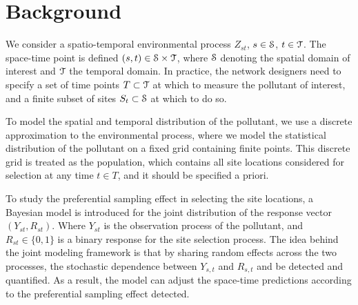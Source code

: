 \section{Background}
We consider a spatio-temporal environmental process $Z_{st}$, $s\in \mathcal{S}$, $t\in \mathcal{T}$.
The space-time point is defined $(s, t) \in \mathcal{S} \times \mathcal{T}$, where $\mathcal{S}$ denoting the spatial 
domain of interest and $\mathcal{T}$ the temporal domain. 
In practice, the network designers need to specify a set of time points $T \subset \mathcal{T}$ at which to 
measure the pollutant of interest, and a finite subset of sites $S_t \subset \mathcal{S}$ at which to do so.

To model the spatial and temporal distribution of the pollutant, we use a discrete approximation to 
the environmental process, where we model the statistical distribution of the pollutant on a fixed 
grid containing finite points. This discrete grid is treated as the population, which contains all site 
locations considered for selection at any time $t \in T$, and it should be specified a priori. 

To study the preferential sampling effect in selecting the site locations, a Bayesian model is 
introduced for the joint distribution of the response vector $(Y_{st}, R_{st})$.
Where $Y_{st}$ is the observation process of the pollutant, and $R_{st} \in \{0, 1\}$ is a binary 
response for the site selection process.
The idea behind the joint modeling framework is that by sharing random effects across the two 
processes, the stochastic dependence between  $Y_{s, t}$ and $R_{s, t}$ and be detected and 
quantified. As a result, the model can adjust the space-time predictions according to the preferential 
sampling effect detected.

